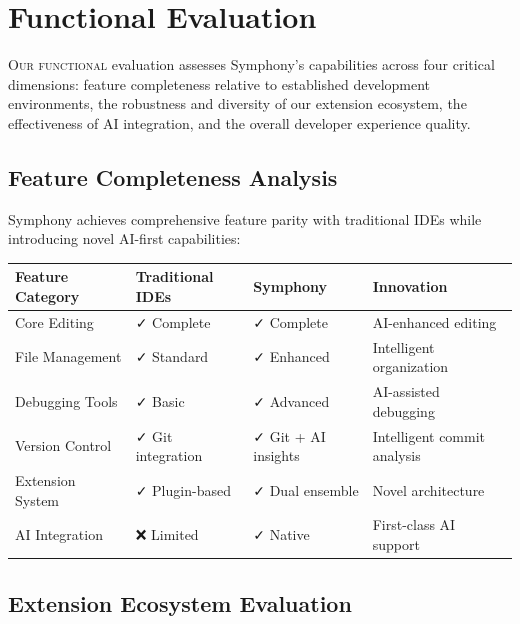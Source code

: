 
\section*{Functional Evaluation}

\lettrine{O}{ur functional} evaluation assesses Symphony's capabilities across four critical dimensions: feature completeness relative to established development environments, the robustness and diversity of our extension ecosystem, the effectiveness of AI integration, and the overall developer experience quality.

\subsection*{Feature Completeness Analysis}

Symphony achieves comprehensive feature parity with traditional IDEs while introducing novel AI-first capabilities:

\begin{center}
\begin{tabular}{@{}llll@{}}
\toprule
\textbf{Feature Category} & \textbf{Traditional IDEs} & \textbf{Symphony} & \textbf{Innovation} \\
\midrule
Core Editing & ✓ Complete & ✓ Complete & AI-enhanced editing \\
File Management & ✓ Standard & ✓ Enhanced & Intelligent organization \\
Debugging Tools & ✓ Basic & ✓ Advanced & AI-assisted debugging \\
Version Control & ✓ Git integration & ✓ Git + AI insights & Intelligent commit analysis \\
Extension System & ✓ Plugin-based & ✓ Dual ensemble & Novel architecture \\
AI Integration & ❌ Limited & ✓ Native & First-class AI support \\
\bottomrule
\end{tabular}
\end{center}

\subsection*{Extension Ecosystem Evaluation}

